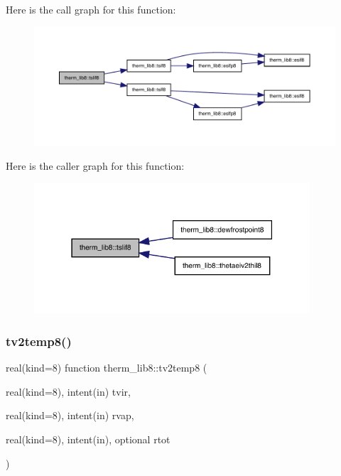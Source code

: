 Here is the call graph for this function\+:
\nopagebreak
\begin{figure}[H]
\begin{center}
\leavevmode
\includegraphics[width=350pt]{namespacetherm__lib8_ada59a10b18f64fb7eba657201813da06_cgraph}
\end{center}
\end{figure}
Here is the caller graph for this function\+:
\nopagebreak
\begin{figure}[H]
\begin{center}
\leavevmode
\includegraphics[width=291pt]{namespacetherm__lib8_ada59a10b18f64fb7eba657201813da06_icgraph}
\end{center}
\end{figure}
\mbox{\label{namespacetherm__lib8_ae028e7a977aa12e130948694af49c31d}} 
\subsubsection{\texorpdfstring{tv2temp8()}{tv2temp8()}}
{\footnotesize\ttfamily real(kind=8) function therm\+\_\+lib8\+::tv2temp8 (\begin{DoxyParamCaption}\item[{real(kind=8), intent(in)}]{tvir,  }\item[{real(kind=8), intent(in)}]{rvap,  }\item[{real(kind=8), intent(in), optional}]{rtot }\end{DoxyParamCaption})}

